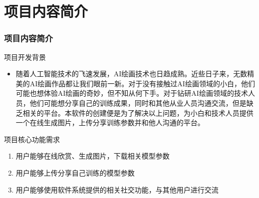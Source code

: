 %
%
%
%
\section{项目内容简介}
    \begin{frame}
    \frametitle{项目内容简介}
        \footnotesize
        \begin{block}{项目开发背景}
            \begin{itemize}
                \item {随着人工智能技术的飞速发展，AI绘画技术也日趋成熟。近些日子来，无数精美的AI绘画作品都让我们眼前一新。对于没有接触过AI绘画领域的小白，他们可能也想体验AI绘画的奇妙，但不知从何下手。对于钻研AI绘画领域的技术人员，他们可能想分享自己的训练成果，同时和其他从业人员沟通交流，但是缺乏相关的平台。本软件的创建便是为了解决以上问题，为小白和技术人员提供一个在线生成图片，上传分享训练参数并和他人沟通的平台。}
            \end{itemize}
        \end{block}

        \begin{block}{项目核心功能需求}
            \begin{enumerate}
                \item 用户能够在线欣赏、生成图片，下载相关模型参数
                \item 用户能够上传分享自己训练的模型参数
                \item 用户能够使用软件系统提供的相关社交功能，与其他用户进行交流
            \end{enumerate}
        \end{block}
    \end{frame}

